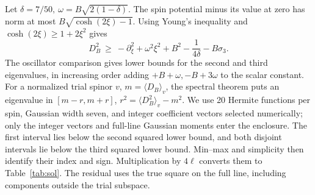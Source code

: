 Let \(\delta=7/50,\ \omega=B\sqrt{2(1-\delta)}\). The spin potential minus its value at zero has norm at most \(B\sqrt{\cosh(2\xi)-1}\). Using Young's inequality and \(\cosh(2\xi)\ge1+2\xi^2\) gives
\[
 D_B^2\ \ge\ -\partial_\xi^2+\omega^2\xi^2+B^2-\frac1{4\delta}-B\sigma_3 .
\]
The oscillator comparison gives lower bounds for the second and third eigenvalues, in increasing order adding \(+B+\omega,-B+3\omega\) to the scalar constant. For a normalized trial spinor \(v\), \(m=\langle D_B\rangle_v\), the spectral theorem puts an eigenvalue in \([m-r,m+r]\), \(r^2=\langle D_B^2\rangle_v-m^2\). We use 20 Hermite functions per spin, Gaussian width seven, and integer coefficient vectors selected numerically; only the integer vectors and full-line Gaussian moments enter the enclosure. The first interval lies below the second squared lower bound, and both disjoint intervals lie below the third squared lower bound. Min--max and simplicity then identify their index and sign. Multiplication by \(4\ell\) converts them to Table~\ref{tab:sol}. The residual uses the true square on the full line, including components outside the trial subspace.
